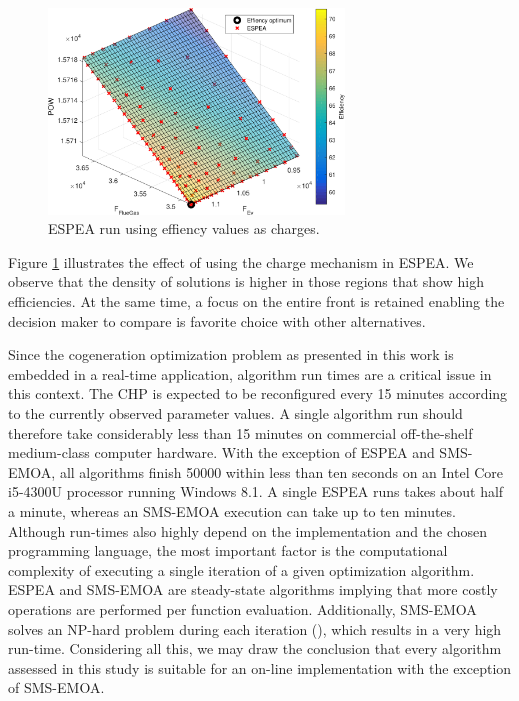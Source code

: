 \begin{figure}
\centering
\includegraphics[width=0.7\textwidth]{figures/espeacharge_cropped.pdf}
\caption{ESPEA run using effiency values as charges.}
\label{fig:espea}
\end{figure}

Figure \ref{fig:espea} illustrates the effect of using the charge mechanism in ESPEA. We observe that the density of solutions is higher in those regions that show high efficiencies. At the same time, a focus on the entire front is retained enabling the decision maker to compare is favorite choice with other alternatives.

Since the cogeneration optimization problem as presented in this work is embedded in a real-time application, algorithm run times are a critical issue in this context. The CHP is expected to be reconfigured every 15 minutes according to the currently observed parameter values. A single algorithm run should therefore take considerably less than 15 minutes on commercial off-the-shelf medium-class computer hardware. With the exception of ESPEA and SMS-EMOA, all algorithms finish \num{50000} within less than ten seconds on an Intel Core i5-4300U processor running Windows 8.1. A single ESPEA runs takes about half a minute, whereas an SMS-EMOA execution can take up to ten minutes. Although run-times also highly depend on the implementation and the chosen programming language, the most important factor is the computational complexity of executing a single iteration of a given optimization algorithm. ESPEA and SMS-EMOA are steady-state algorithms implying that more costly operations are performed per function evaluation. Additionally, SMS-EMOA solves an NP-hard problem during each iteration (\cite{hypervolumecontribution}), which results in a very high run-time. Considering all this, we may draw the conclusion that every algorithm assessed in this study is suitable for an on-line implementation with the exception of SMS-EMOA.


